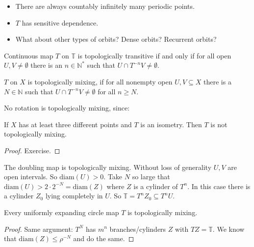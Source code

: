 \documentclass{article}
\newcommand*{\N}{\mathbb{N}}
\newcommand*{\T}{\mathbb{T}}
\newcommand*{\Ns}{\N^*}
\newcommand*{\diam}{\text{diam}}
\begin{document}
\begin{itemize}
    \item There are always countably infinitely many periodic points.

    \item $T$ has sensitive dependence.

    \item What about other types of orbits? Dense orbits? Recurrent orbits?
\end{itemize}

\begin{rec}
    Continuous map $T$ on $\T$ is topologically transitive if and only if for all open $U,V\neq \emptyset$ there is an $n\in\Ns$ such that $U\cap T^{-n}V\neq \emptyset$.
\end{rec}

\begin{defin}
    $T$ on $X$ is topologically mixing, if for all nonempty open $U,V\subseteq X$ there is a $N\in\N$ such that $U\cap T^{-n}V\neq \emptyset$ for all $n\geq N$.
\end{defin}

\begin{exam}
    No rotation is topologically mixing, since:
\end{exam}

\begin{prop}
    If $X$ has at least three different points and $T$ is an isometry. Then $T$ is not topologically mixing.
\end{prop}

\begin{proof}
    Exercise.
\end{proof}

\begin{exam}
    The doubling map is topologically mixing. Without loss of generality $U,V$ are open intervals. So $\diam(U) > 0$. Take $N$ so large that $\diam(U)>2\cdot 2^{-N}=\diam(Z)$ where $Z$ is a cylinder of $T^n$. In this case there is a cylinder $Z_0$ lying completely in $U$. So $\T = T^nZ_0\subseteq T^nU$.
\end{exam}

\begin{prop}
    Every uniformly expanding circle map $T$ is topologically mixing.
\end{prop}

\begin{proof}
    Same argument: $T^N$ has $m^n$ branches/cylinders $Z$ with $TZ = \T$. We know that $\diam(Z)\leq \rho^{-N}$ and do the same.
\end{proof}
\end{document}
